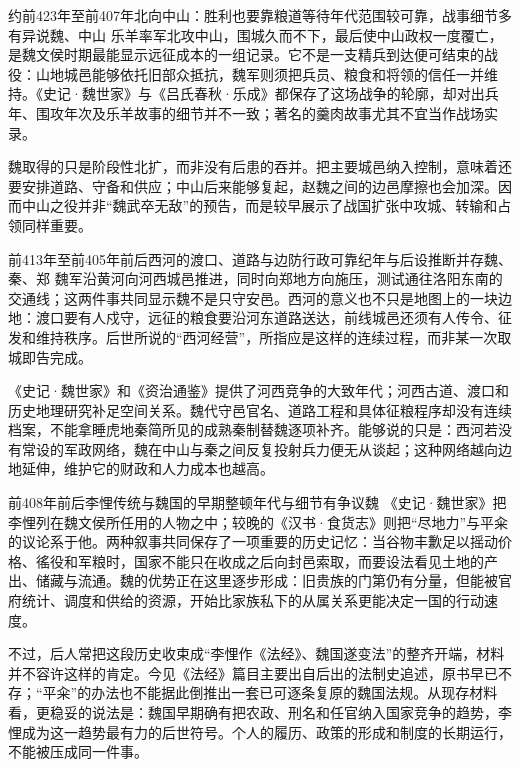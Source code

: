 \begin{event}{约前423年至前407年}{北向中山：胜利也要靠粮道等待}{年代范围较可靠，战事细节多有异说}{魏、中山}
乐羊率军北攻中山，围城久而不下，最后使中山政权一度覆亡，是魏文侯时期最能显示远征成本的一组记录。它不是一支精兵到达便可结束的战役：山地城邑能够依托旧部众抵抗，魏军则须把兵员、粮食和将领的信任一并维持。《史记·魏世家》与《吕氏春秋·乐成》都保存了这场战争的轮廓，却对出兵年、围攻年次及乐羊故事的细节并不一致；著名的羹肉故事尤其不宜当作战场实录。

魏取得的只是阶段性北扩，而非没有后患的吞并。把主要城邑纳入控制，意味着还要安排道路、守备和供应；中山后来能够复起，赵魏之间的边邑摩擦也会加深。因而中山之役并非“魏武卒无敌”的预告，而是较早展示了战国扩张中攻城、转输和占领同样重要。
\end{event}

\begin{event}{前413年至前405年前后}{西河的渡口、道路与边防行政}{可靠纪年与后设推断并存}{魏、秦、郑}
魏军沿黄河向河西城邑推进，同时向郑地方向施压，测试通往洛阳东南的交通线；这两件事共同显示魏不是只守安邑。西河的意义也不只是地图上的一块边地：渡口要有人戍守，远征的粮食要沿河东道路送达，前线城邑还须有人传令、征发和维持秩序。后世所说的“西河经营”，所指应是这样的连续过程，而非某一次取城即告完成。

《史记·魏世家》和《资治通鉴》提供了河西竞争的大致年代；河西古道、渡口和历史地理研究补足空间关系。魏代守邑官名、道路工程和具体征粮程序却没有连续档案，不能拿睡虎地秦简所见的成熟秦制替魏逐项补齐。能够说的只是：西河若没有常设的军政网络，魏在中山与秦之间反复投射兵力便无从谈起；这种网络越向边地延伸，维护它的财政和人力成本也越高。
\end{event}

\begin{event}{前408年前后}{李悝传统与魏国的早期整顿}{年代与细节有争议}{魏}
《史记·魏世家》把李悝列在魏文侯所任用的人物之中；较晚的《汉书·食货志》则把“尽地力”与平籴的议论系于他。两种叙事共同保存了一项重要的历史记忆：当谷物丰歉足以摇动价格、徭役和军粮时，国家不能只在收成之后向封邑索取，而要设法看见土地的产出、储藏与流通。魏的优势正在这里逐步形成：旧贵族的门第仍有分量，但能被官府统计、调度和供给的资源，开始比家族私下的从属关系更能决定一国的行动速度。

不过，后人常把这段历史收束成“李悝作《法经》、魏国遂变法”的整齐开端，材料并不容许这样的肯定。今见《法经》篇目主要出自后出的法制史追述，原书早已不存；“平籴”的办法也不能据此倒推出一套已可逐条复原的魏国法规。从现存材料看，更稳妥的说法是：魏国早期确有把农政、刑名和任官纳入国家竞争的趋势，李悝成为这一趋势最有力的后世符号。个人的履历、政策的形成和制度的长期运行，不能被压成同一件事。
\end{event}

